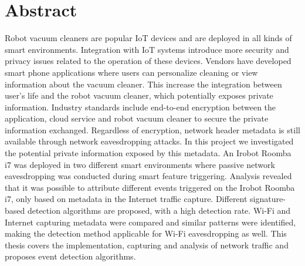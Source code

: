 \chapter*{Abstract}

Robot vacuum cleaners are popular IoT devices and are deployed in all kinds of smart environments. Integration with IoT systems introduce more security and privacy issues related to the operation of these devices. Vendors have developed smart phone applications where users can personalize cleaning or view information about the vacuum cleaner. This increase the integration between user's life and the robot vacuum cleaner, which potentially exposes private information. Industry standards include end-to-end encryption between the application, cloud service and robot vacuum cleaner to secure the private information exchanged. Regardless of encryption, network header metadata is still available through network eavesdropping attacks. In this project we investigated the potential private information exposed by this metadata. An Irobot Roomba i7 was deployed in two different smart environments where passive network eavesdropping was conducted during smart feature triggering. Analysis revealed that it was possible to attribute different events triggered on the Irobot Roomba i7, only based on metadata in the Internet traffic capture. Different signature-based detection algorithms are proposed, with a high detection rate. Wi-Fi and Internet capturing metadata were compared and similar patterns were identified, making the detection method applicable for Wi-Fi eavesdropping as well. This thesis covers the implementation, capturing and analysis of network traffic and proposes event detection algorithms.    


